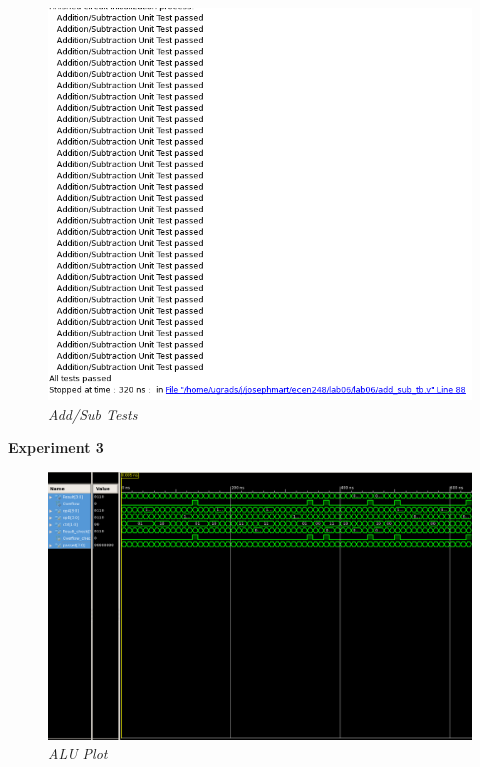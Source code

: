 \documentclass[a4paper,12pt]{article}
\begin{document}
\begin{figure}[h]
  \begin{center}
    \includegraphics[scale=0.5]{Add_SubTests.png}
    \caption{\textit{Add/Sub Tests}}
  \end{center}
\end{figure}
\newpage
\hspace{-15pt}\textbf{Experiment 3}
\begin{figure}[h]
  \begin{center}
    \includegraphics[scale=0.4]{ALUPlots.png}
    \caption{\textit{ALU Plot}}
  \end{center}
\end{figure}
\end{document}

